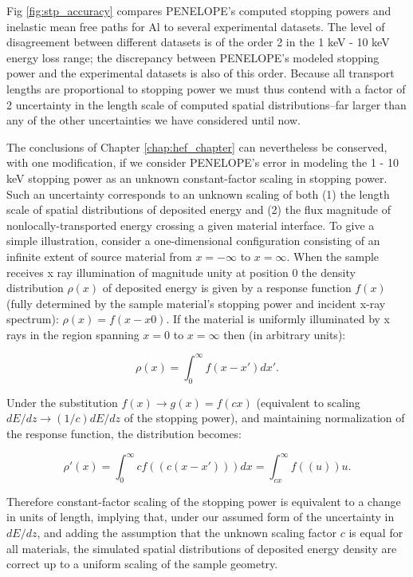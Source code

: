 \documentclass [11pt, proquest, article] {uwthesis}[2016/11/22]
\begin{document}
Fig \ref{fig:stp_accuracy} compares PENELOPE's computed stopping powers and inelastic mean free paths for Al to several experimental datasets. \cite{salvat2008penelope} The level of disagreement between different datasets is of the order 2 in the 1 keV - 10 keV energy loss range; the discrepancy between PENELOPE's modeled stopping power and the experimental datasets is also of this order. Because all transport lengths are proportional to stopping power we must thus contend with a factor of 2 uncertainty in the length scale of computed spatial distributions--far larger than any of the other uncertainties we have considered until now. 

The conclusions of Chapter \ref{chap:hef_chapter} can nevertheless be conserved, with one modification, if we consider PENELOPE's error in modeling the 1 - 10 keV stopping power as an unknown constant-factor scaling in stopping power. Such an uncertainty corresponds to an unknown scaling of both (1) the length scale of spatial distributions of deposited energy and (2) the flux magnitude of nonlocally-transported energy crossing a given material interface. To give a simple illustration, consider a one-dimensional configuration consisting of an infinite extent of source material from $x = -\infty$ to $x = \infty$. When the sample receives x ray illumination of magnitude unity at position $0$ the density distribution $\rho(x)$ of deposited energy is given by a response function $f(x)$ (fully determined by the sample material's stopping power and incident x-ray spectrum): $ \rho(x) = f(x - x0) $. If the material is uniformly illuminated by x rays in the region spanning $x = 0$ to $x = \infty$ then (in arbitrary units):

$$
\rho(x) = \int_0^{\infty} f(x - x') dx'.
$$

Under the substitution $f(x) \rightarrow g(x) = f(c x)$ (equivalent to scaling $dE/dz \rightarrow (1/c) dE/dz$ of the stopping power), and maintaining normalization of the response function, the distribution becomes:

$$
\rho'(x) = \int_0^{\infty} c f((c (x -  x'))) dx = \int_{cx}^{\infty} f((u)) u.
$$

Therefore constant-factor scaling of the stopping power is equivalent to a change in units of length, implying that, under our assumed form of the uncertainty in $dE/dz$, and adding the assumption that the unknown scaling factor $c$ is equal for all materials, the simulated spatial distributions of deposited energy density are correct up to a uniform scaling of the sample geometry. 
\end{document}
